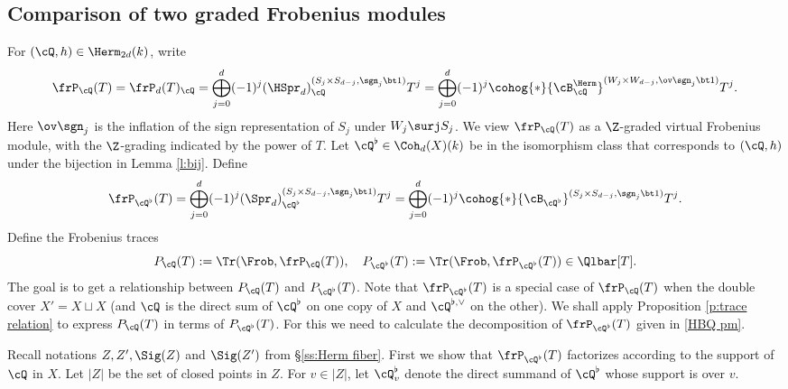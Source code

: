 

\subsection{Comparison of two graded Frobenius modules}%
For $(\cQ,h)\in \Herm_{2d}(k)$, write
\[
\frP_{\cQ}(T)=\frP_{d}(T)_{\cQ}=\bigoplus_{j=0}^{d} (-1)^{j}(\HSpr_{d})_{\cQ}^{(S_{j}\times S_{d-j}, \sgn_{j}\bt1)}T^{j} = \bigoplus_{j=0}^{d} (-1)^{j}\cohog{*}{\cB^{\Herm}_{\cQ}}^{(W_{j}\times W_{d-j}, \ov\sgn_{j}\bt1)}T^{j}.
\]
Here $\ov\sgn_{j}$ is the inflation of the sign representation of $S_{j}$ under $W_{j}\surj S_{j}$. We view $\frP_{\cQ}(T)$  as a $\Z$-graded virtual Frobenius module, with the $\Z$-grading indicated by the power of $T$.  Let $\cQ^{\flat}\in \Coh_{d}(X)(k)$ be in the isomorphism class that corresponds to $(\cQ,h)$ under the bijection in Lemma \ref{l:bij}. Define
\[
\frP_{\cQ^{\flat}}(T)=\bigoplus_{j=0}^{d} (-1)^{j}(\Spr_{d})_{\cQ^{\flat}}^{(S_{j}\times S_{d-j}, \sgn_{j}\bt1)}T^{j} =\bigoplus_{j=0}^{d} (-1)^{j}\cohog{*}{\cB_{\cQ^{\flat}}}^{(S_{j}\times S_{d-j}, \sgn_{j}\bt1)}T^{j}.
\]
Define the Frobenius traces
\begin{equation*}
P_{\cQ}(T):=\Tr(\Frob,\frP_{\cQ}(T)), \quad  P_{\cQ^{\flat}}(T):=\Tr(\Frob,\frP_{\cQ^{\flat}}(T)) \in \Qlbar[T].
\end{equation*}
The goal is to get a relationship between $P_{\cQ}(T)$ and $P_{\cQ^{\flat}}(T)$. Note that $\frP_{\cQ^{\flat}}(T)$ is a special case of $\frP_{\cQ}(T)$ when the double cover $X'=X\sqcup X$ (and $\cQ$ is the direct sum of $\cQ^{\flat}$ on one copy of $X$ and $\cQ^{\flat,\vee}$ on the other). We shall apply Proposition \ref{p:trace relation} to express $P_{\cQ}(T)$ in terms of $P_{\cQ^{\flat}}(T)$. For this we need to calculate the decomposition of $\frP_{\cQ^{\flat}}(T)$ given in \eqref{HBQ pm}.


Recall notations $Z, Z', \Sig(Z)$ and $\Sig(Z')$ from \S\ref{ss:Herm fiber}.   First we show that $\frP_{\cQ^{\flat}}(T)$ factorizes according to the support of $\cQ$ in $X$. Let $|Z|$ be the set of closed points in $Z$.   For $v\in |Z|$, let $\cQ^{\flat}_{v}$ denote the direct summand of $\cQ^{\flat}$ whose support is over $v$.

